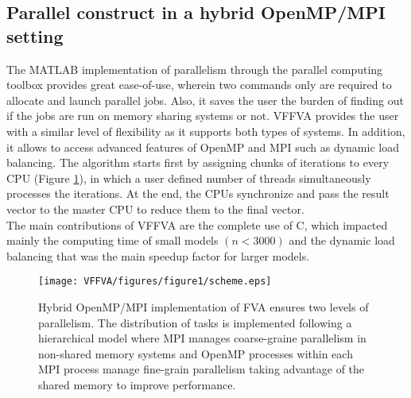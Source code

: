 \subsection{Parallel construct in a hybrid OpenMP/MPI setting} 
The MATLAB implementation of parallelism through the parallel computing toolbox provides great ease-of-use, wherein two commands only are required to allocate and launch parallel jobs. Also, it saves the user the burden of finding out if the jobs are run on memory sharing systems or not. VFFVA provides the user with a similar level of flexibility as it supports both types of systems. In addition, it allows to access advanced features of OpenMP and MPI such as dynamic load balancing. The algorithm starts first by assigning chunks of iterations to every CPU (Figure \ref{fig:hybrid.}), in which a user defined number of threads simultaneously processes the iterations. At the end, the CPUs synchronize and pass the result vector to the master CPU to reduce them to the final vector. \\
The main contributions of VFFVA are the complete use of C, which impacted mainly the computing time of small models $(n<3000)$ and the dynamic load balancing that was the main speedup factor for larger models.
\begin{figure}[!htp]
\centering
\texttt{[image: VFFVA/figures/figure1/scheme.eps]}
\caption[Hybrid OpenMP/MPI implementation of FVA.]{Hybrid OpenMP/MPI implementation of FVA ensures two levels of parallelism. The distribution of tasks is implemented following a hierarchical model where MPI manages coarse-graine parallelism in non-shared memory systems and OpenMP processes within each MPI process manage fine-grain parallelism taking advantage of the shared memory to improve performance.}
\label{fig:hybrid.}
\end{figure}
